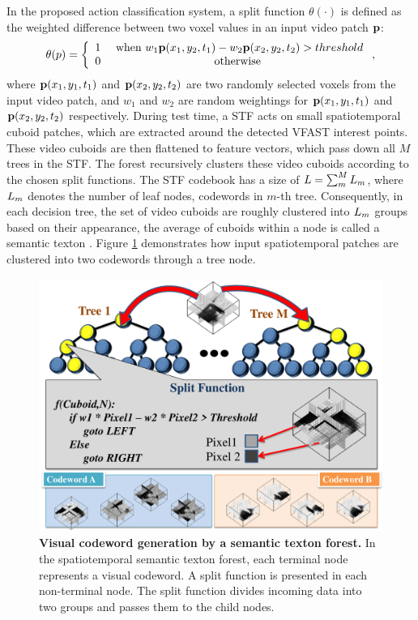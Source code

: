 In the proposed action classification system, a split function $\theta(\cdot)$ is defined as the weighted difference between two voxel values in an input video patch $\mathbf{p}$:
\begin{equation}
	\theta(p) = 
	\left\{
		\begin{array}{lc}
			1 & \mbox{ when } w_1 \mathbf{p}(x_1,y_2,t_1) - w_2 \mathbf{p}(x_2,y_2,t_2) > threshold \\  
			0 & \mbox{ otherwise } 
		\end{array}
	\right.,
	\label{eqn/act/stftest}
\end{equation}
where $\mathbf{p}(x_1, y_1, t_1)$ and $\mathbf{p}(x_2, y_2, t_2)$ are two randomly selected voxels from the input video patch, and $w_1$ and $w_2$ are random weightings for $\mathbf{p}(x_1,y_1,t_1)$ and $\mathbf{p}(x_2,y_2,t_2)$ respectively. 
During test time, a STF acts on small spatiotemporal cuboid patches, which are extracted around the detected VFAST interest points. These video cuboids are then flattened to feature vectors, which pass down all $M$ trees in the STF. 
The forest recursively clusters these video cuboids according to the chosen split functions.  
The STF codebook has a size of $L=\sum_m^M L_m$, where $L_m$ denotes the number of leaf nodes, \ie codewords in $m$-th tree. 
Consequently, in each decision tree, the set of video cuboids are roughly clustered into $L_m$ groups based on their appearance, the average of cuboids within a node is called a semantic texton \cite{Shotton2008}. 
Figure \ref{fig/act/stf} demonstrates how input spatiotemporal patches are clustered into two codewords through a tree node. 

\begin{figure}[ht]
	\centering 
	\includegraphics[width=0.8\linewidth]{fig/act/stf_new.pdf} 
	\caption{\textbf{Visual codeword generation by a semantic texton forest.} In the spatiotemporal semantic texton forest, each terminal node represents a visual codeword. A split function is presented in each non-terminal node. The split function divides incoming data into two groups and passes them to the child nodes.}
	\label{fig/act/stf}
\end{figure}


